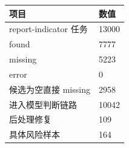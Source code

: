 \begin{tabular}{ll}
\toprule
项目 & 数值 \\
\midrule
report-indicator 任务 & 13000 \\
found & 7777 \\
missing & 5223 \\
error & 0 \\
候选为空直接 missing & 2958 \\
进入模型判断链路 & 10042 \\
后处理修复 & 109 \\
具体风险样本 & 164 \\
\bottomrule
\end{tabular}
